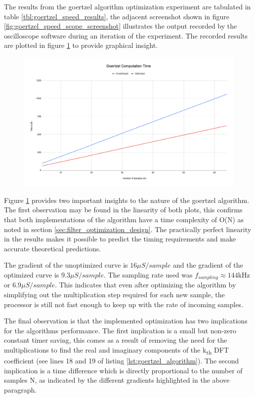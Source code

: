 The results from the goertzel algorithm optimization experiment are tabulated in table \ref{tbl:goertzel_speed_results}, the adjacent screenshot shown in figure \ref{fig:goertzel_speed_scope_screenshot} illustrates the output recorded by the oscilloscope software during an iteration of the experiment. The recorded results are plotted in figure \ref{fig:goertzel_computation_plot} to provide graphical insight.

\begin{figure}[H]
	\centering
	\includegraphics[width=\linewidth]{figures/results/goertzel_filter_speed/goertzel_computation_time.png}
	\label{fig:goertzel_computation_plot}
\end{figure}

Figure \ref{fig:goertzel_computation_plot} provides two important insights to the nature of the goertzel algorithm. The first observation may be found in the linearity of both plots, this confirms that both implementations of the algorithm have a time complexity of O(N) as noted in section \ref{sec:filter_optimization_design}. The practically perfect linearity in the results makes it possible to predict the timing requirements and make accurate theoretical predictions.

The gradient of the unoptimized curve is $16\mu S/sample$ and the gradient of the optimized curve is $9.3\mu S/sample$. The sampling rate used was $f_{sampling} \approx 144$kHz or $6.9\mu S/sample$. This indicates that even after optimizing the algorithm by simplifying out the multiplication step required for each new sample, the processor is still not fast enough to keep up with the rate of incoming samples.

The final observation is that the implemented optimization has two implications for the algorithms performance. The first implication is a small but non-zero constant timer saving, this comes as a result of removing the need for the multiplications to find the real and imaginary components of the k\textsubscript{th} DFT coefficient (see lines 18 and 19 of listing \ref{lst:goertzel_algorithm}). The second implication is a time difference which is directly proportional to the number of samples N, as indicated by the different gradients highlighted in the above paragraph.

